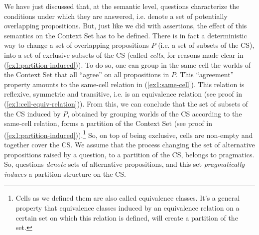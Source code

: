 We have just discussed that, at the semantic level, questions characterize the conditions under which they are answered, i.e. denote a set of potentially overlapping propositions. But, just like we did with assertions, the effect of this semantics on the Context Set has to be defined. There is in fact a deterministic way to change a set of overlapping propositions $P$ (i.e. a set of subsets of the CS), into a set of exclusive subsets of the CS (called \textit{cells}, for reasons made clear in (\ref{ex1:partition-induced})). To do so, one can group in the same cell the worlds of the Context Set that all ``agree'' on all propositions in $P$. This ``agreement'' property amounts to the same-cell relation in (\ref{ex1:same-cell}). This relation is reflexive, symmetric and transitive, i.e. is an equivalence relation (see proof in (\ref{ex1:cell-equiv-relation})). From this, we can conclude that the set of subsets of the CS induced by $P$, obtained by grouping worlds of the CS according to the same-cell relation, forms a partition of the Context Set (see proof in (\ref{ex1:partition-induced})).\footnote{Cells as we defined them are also called equivalence classes. It's a general property that equivalence classes induced by an equivalence relation on a certain set on which this relation is defined, will create a partition of the set.} So, on top of being exclusive, cells are non-empty and together cover the CS. We assume that the process changing the set of alternative propositions raised by a question, to a partition of the CS, belongs to pragmatics. So, questions \textit{denote} sets of alternative propositions, and this set \textit{pragmatically induces} a partition structure on the CS.

